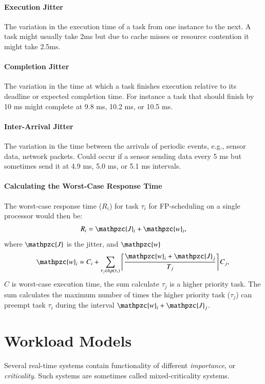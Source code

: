 \paragraph{Execution Jitter} The variation in the execution time of a task from one instance to the next. A task might usually take 2ms but due to cache misses or resource contention it might take 2.5ms.
\paragraph{Completion Jitter} The variation in the time at which a task finishes execution relative to its deadline or expected completion time. For instance a task that should finish by 10 ms might complete at 9.8 ms, 10.2 ms, or 10.5 ms.
\paragraph{Inter-Arrival Jitter} The variation in the time between the arrivals of periodic events, e.g., sensor data, network packets. Could occur if a sensor sending data every 5 ms but sometimes send it at 4.9 ms, 5.0 ms, or 5.1 ms intervals.

\paragraph{Calculating the Worst-Case Response Time}
The worst-case response time ($R_i$) for task $\tau_i$ for FP-scheduling on a single processor would then be:
\begin{equation*}
  R_i = \mathpzc{J}_i + \mathpzc{w}_i,
\end{equation*}
where $\mathpzc{J}$ is the jitter, and $\mathpzc{w}$
\begin{equation*}
  \mathpzc{w}_i = C_i + \sum_{\tau_j \in hp(\tau_i)} \left\lceil\frac{\mathpzc{w}_i + \mathpzc{J}_j}{T_j}\right\rceil C_j, \\
\end{equation*}
$C$ is worst-case execution time, the sum calculate $\tau_j$ is a higher priority task. The sum calculates the maximum number of times the higher priority task ($\tau_j$) can preempt task $\tau_i$ during the interval $\mathpzc{w}_i+\mathpzc{J}_j$.



\section{Workload Models}
Several real-time systems contain functionality of different 
\textit{importance}, or \textit{criticality}. 
Such systems are sometimes called mixed-criticality systems.


